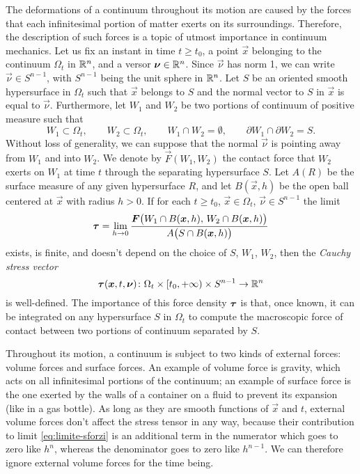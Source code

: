 The deformations of a continuum throughout its motion are caused by
the forces that each infinitesimal portion of matter exerts on
its surroundings. Therefore, the description of such forces is
a topic of utmost importance in continuum mechanics.
Let us fix an instant in time $t \geq t_0$, a point $\vec{x}$ belonging to
the continuum $\Omega_t$ in $\mathbb{R}^n$, and a versor $\bm{\nu} \in \mathbb{R}^n$.
Since $\vec{\nu}$ has norm 1, we can write $\vec{\nu} \in S^{n-1}$,
with $S^{n-1}$ being the unit sphere in $\mathbb{R}^n$.
Let $S$ be an oriented smooth hypersurface in $\Omega_t$ such that
$\vec{x}$ belongs to $S$ and the normal vector
to $S$ in $\vec{x}$ is equal to $\vec{\nu}$.
Furthermore, let $W_1$ and $W_2$ be two portions of continuum of positive
measure such that
\[
W_1 \subset \Omega_t,
\qquad W_2 \subset \Omega_t,
\qquad W_1 \cap W_2 = \emptyset,
\qquad \partial W_1 \cap \partial W_2 = S.
\]
Without loss of generality, we can suppose that the normal $\vec{\nu}$
is pointing away from $W_1$ and into $W_2$. We denote by $\vec{F}(W_1,W_2)$
the contact force that $W_2$ exerts on $W_1$ at time $t$ through the
separating hypersurface $S$. Let $A(R)$ be the surface measure
of any given hypersurface $R$, and let $B(\vec{x},h)$ be the open ball centered
at $\vec{x}$ with radius $h > 0$.
If for each $t \geq t_0$, $\vec{x} \in \Omega_t$, $\vec{\nu} \in S^{n-1}$
the limit
\begin{equation} \label{eq:limite-sforzi}
\bm{\tau} =
\lim_{h \to 0}
	\frac{\bm{F}\bigl(W_1 \cap B(\bm{x},h), \, W_2 \cap B(\bm{x},h)\bigr)}
	     {A\bigl(S \cap B(\bm{x},h)\bigr)}
\end{equation}
exists, is finite, and doesn't depend on the choice of $S$, $W_1$, $W_2$,
then the \emph{Cauchy stress vector}
\[
\bm{\tau}(\bm{x},t,\bm{\nu})
\colon \Omega_t \times [t_0,+\infty) \times S^{n-1} \to \mathbb{R}^n
\]
is well-defined.
The importance of this force density $\bm{\tau}$ is that,
once known, it can be integrated on any hypersurface $S$ in $\Omega_t$
to compute the macroscopic force of contact between two
portions of continuum separated by $S$.

Throughout its motion, a continuum is subject to two kinds of external forces:
volume forces and surface forces. An example of volume force is gravity,
which acts on all infinitesimal portions of the continuum;
an example of surface force is the one exerted by the walls
of a container on a fluid to prevent its expansion (like in a gas bottle).
As long as they are smooth functions of $\vec{x}$ and $t$,
external volume forces don't affect the stress tensor in any way,
because their contribution to limit \eqref{eq:limite-sforzi}
is an additional term in the numerator which goes to zero like $h^n$,
whereas the denominator goes to zero like $h^{n-1}$.
We can therefore ignore external volume forces for the time being.

